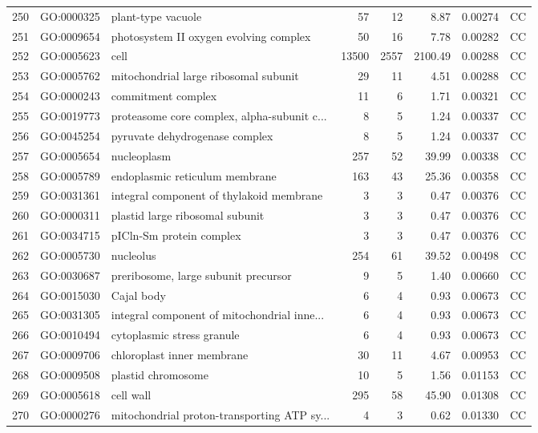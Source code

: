 \documentclass[12pt,oneside,a4paper]{article}
\begin{document}
\begin{longtable}{rllrrrll}
  250 & GO:0000325 & plant-type vacuole &  57 &  12 & 8.87 & 0.00274 & CC \\ 
  251 & GO:0009654 & photosystem II oxygen evolving complex &  50 &  16 & 7.78 & 0.00282 & CC \\ 
  252 & GO:0005623 & cell & 13500 & 2557 & 2100.49 & 0.00288 & CC \\ 
  253 & GO:0005762 & mitochondrial large ribosomal subunit &  29 &  11 & 4.51 & 0.00288 & CC \\ 
  254 & GO:0000243 & commitment complex &  11 &   6 & 1.71 & 0.00321 & CC \\ 
  255 & GO:0019773 & proteasome core complex, alpha-subunit c... &   8 &   5 & 1.24 & 0.00337 & CC \\ 
  256 & GO:0045254 & pyruvate dehydrogenase complex &   8 &   5 & 1.24 & 0.00337 & CC \\ 
  257 & GO:0005654 & nucleoplasm & 257 &  52 & 39.99 & 0.00338 & CC \\ 
  258 & GO:0005789 & endoplasmic reticulum membrane & 163 &  43 & 25.36 & 0.00358 & CC \\ 
  259 & GO:0031361 & integral component of thylakoid membrane &   3 &   3 & 0.47 & 0.00376 & CC \\ 
  260 & GO:0000311 & plastid large ribosomal subunit &   3 &   3 & 0.47 & 0.00376 & CC \\ 
  261 & GO:0034715 & pICln-Sm protein complex &   3 &   3 & 0.47 & 0.00376 & CC \\ 
  262 & GO:0005730 & nucleolus & 254 &  61 & 39.52 & 0.00498 & CC \\ 
  263 & GO:0030687 & preribosome, large subunit precursor &   9 &   5 & 1.40 & 0.00660 & CC \\ 
  264 & GO:0015030 & Cajal body &   6 &   4 & 0.93 & 0.00673 & CC \\ 
  265 & GO:0031305 & integral component of mitochondrial inne... &   6 &   4 & 0.93 & 0.00673 & CC \\ 
  266 & GO:0010494 & cytoplasmic stress granule &   6 &   4 & 0.93 & 0.00673 & CC \\ 
  267 & GO:0009706 & chloroplast inner membrane &  30 &  11 & 4.67 & 0.00953 & CC \\ 
  268 & GO:0009508 & plastid chromosome &  10 &   5 & 1.56 & 0.01153 & CC \\ 
  269 & GO:0005618 & cell wall & 295 &  58 & 45.90 & 0.01308 & CC \\ 
  270 & GO:0000276 & mitochondrial proton-transporting ATP sy... &   4 &   3 & 0.62 & 0.01330 & CC \\ 

\end{longtable}
\end{document}
